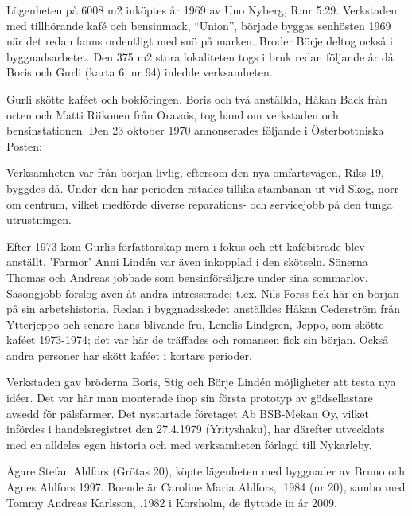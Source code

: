 
Lägenheten på 6008 m2 inköptes år 1969 av Uno Nyberg, R:nr 5:29. Verkstaden med tillhörande kafé och bensinmack, ``Union'', började	byggas senhösten 1969 när det redan fanns ordentligt med snö på marken. Broder Börje deltog också i byggnadsarbetet. Den 375 m2 stora lokaliteten togs i bruk redan följande år då Boris och Gurli	(karta 6, nr 94) inledde verksamheten.

Gurli skötte kaféet och bokföringen. Boris och två anställda, Håkan Back från orten och Matti Riikonen från Oravais, tog hand om verkstaden och bensinstationen. Den 23 oktober 1970 annonserades följande i Österbottniska Posten:


Verksamheten var från början livlig, eftersom den nya omfartsvägen, Riks 19, byggdes då. Under den här perioden rätades  tillika stambanan ut vid Skog, norr om centrum, vilket medförde diverse reparations- och servicejobb på den tunga utrustningen.

Efter 1973 kom Gurlis författarskap mera i fokus och ett kafébiträde blev anställt. 'Farmor' Anni Lindén var även inkopplad i den skötseln. Sönerna Thomas och Andreas jobbade som bensinförsäljare under sina sommarlov. Säsongjobb förslog även åt andra intresserade; t.ex. Nils Forss fick här en början på sin arbetshistoria. Redan i byggnadsskedet anställdes Håkan Cederström från Ytterjeppo och	senare hans blivande fru, Lenelis Lindgren, Jeppo, som skötte kaféet	1973-1974; det var här de träffades och romansen fick sin början.	Också andra personer har skött kaféet i kortare perioder.

Verkstaden gav bröderna Boris, Stig och Börje Lindén möjligheter att testa nya idéer. Det var här man monterade ihop sin första prototyp	av gödsellastare avsedd för pälsfarmer. Det nystartade företaget Ab	BSB-Mekan Oy, vilket infördes i handelsregistret den 27.4.1979 (Yrityshaku), har därefter utvecklats med en alldeles egen historia och med verksamheten förlagd till Nykarleby.




Ägare Stefan Ahlfors (Grötas 20), köpte lägenheten med byggnader av Bruno och Agnes Ahlfors 1997. Boende är Caroline  Maria Ahlfors, .1984 (nr 20), sambo med Tommy Andreas Karlsson, .1982 i Korsholm, de flyttade in år 2009.

